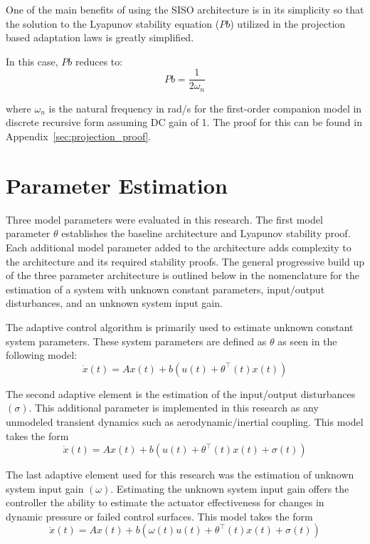 One of the main benefits of using the \ac{SISO} architecture is in its simplicity so that the solution to the Lyapunov stability equation ($Pb$) utilized in the projection based adaptation laws is greatly simplified.  

In this case, $Pb$ reduces to:
\begin{equation}
Pb = \frac{1}{2\omega_n}
\end{equation}

where $\omega_n$ is the natural frequency in rad/s for the first-order companion model in discrete recursive form assuming DC gain of 1.  The proof for this can be found in Appendix~\ref{sec:projection_proof}.

\section{\Lone Parameter Estimation}\label{sec:param_estimation}
Three model parameters were evaluated in this research.   The first model parameter $\theta$ establishes the baseline architecture and Lyapunov stability proof.  Each additional  model parameter added to the architecture adds complexity to the architecture and its required stability proofs.  The general progressive build up of the three parameter architecture is outlined below in the nomenclature for the estimation of a system with unknown constant parameters, input/output disturbances, and an unknown system input gain.

The \Lone adaptive control algorithm is primarily used to estimate unknown constant system parameters.  These system parameters are defined as $\theta$ as seen in the following model:
\begin{equation}
\dot{x}(t)=Ax(t)+b(u(t)+\theta^{\top}(t)x(t))
\end{equation}

The second adaptive element is the estimation of the input/output disturbances $(\sigma)$.  This additional parameter is implemented in this research as any unmodeled transient dynamics such as aerodynamic/inertial coupling.  This model takes the form
\begin{equation}
\dot{x}(t)=Ax(t)+b(u(t)+\theta^{\top}(t)x(t)+\sigma(t))
\end{equation}

The last adaptive element used for this research was the estimation of unknown system input gain $(\omega)$.  Estimating the unknown system input gain offers the controller the ability to estimate the actuator effectiveness for changes in dynamic pressure or failed control surfaces.  This model takes the form
\begin{equation}\label{eq:l_one_model}
\dot{x}(t)=Ax(t)+b(\omega(t)u(t)+\theta^{\top}(t)x(t)+\sigma(t))
\end{equation}  

